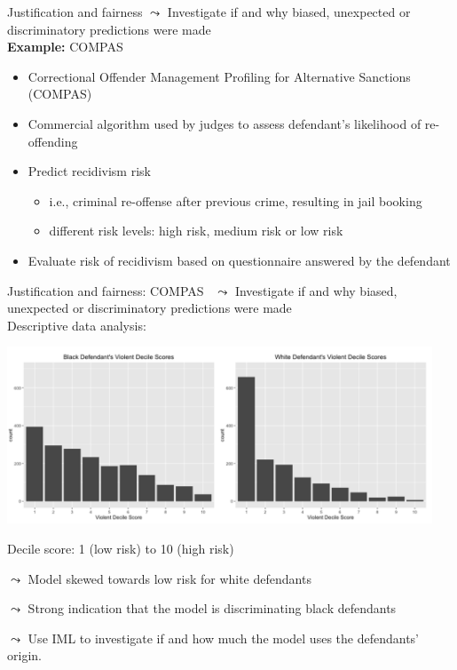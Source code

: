 \documentclass[11pt,compress,t,notes=noshow, aspectratio=169, xcolor=table]{beamer}
\begin{document}
\begin{frame}{Justification and fairness}
    $\leadsto$ Investigate if and why biased, unexpected or discriminatory predictions were made \\
    \bigskip
    \textbf{Example:} COMPAS
    \smallskip
    \begin{itemize}
        \item Correctional Offender Management Profiling for Alternative Sanctions (COMPAS)
        \smallskip
        \item Commercial algorithm used by judges to assess defendant’s likelihood of re-offending
        \pause
        \smallskip
        \item Predict recidivism risk
        \begin{itemize}
            \item i.e., criminal re-offense after previous crime, resulting in jail booking
            \smallskip
            \item different risk levels: high risk, medium risk or low risk
        \end{itemize}
        \smallskip
        \item Evaluate risk of recidivism based on questionnaire answered by the defendant
    \end{itemize}

\end{frame}

\begin{frame}{Justification and fairness: COMPAS~}
    $\leadsto$ Investigate if and why biased, unexpected or discriminatory predictions were made \\
    \medskip
    Descriptive data analysis: 
    
    \centering
    \includegraphics[width=0.95\textwidth]{figure/compass_black_white.PNG}

    Decile score: 1 (low risk) to 10 (high risk)

    \medskip
    \raggedright
	$\leadsto$ Model skewed towards low risk for white defendants
	
	$\leadsto$ Strong indication that the model is discriminating black defendants
	
	$\leadsto$ Use IML to investigate if and how much the model uses the defendants' origin.
\end{frame}
\end{document}
